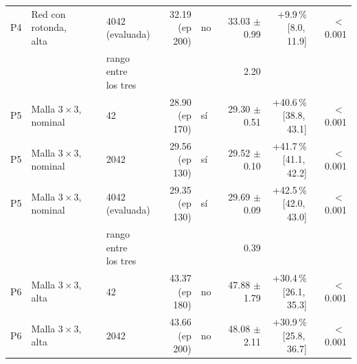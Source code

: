 \begin{table}[H]
\begin{tabular}{lllrlrrr}
P4 & \makecell[l]{Red con rotonda,\\{}alta} & \makecell[l]{4042\\{}(evaluada)} & \makecell[r]{32.19\\{}(ep 200)} & no & \makecell[r]{33.03\\{}$\pm$ 0.99} & \makecell[r]{+9.9\,\%\\{}[8.0,\,11.9]} & $<$\,0.001 \\
 & & \makecell[l]{rango entre\\{}los tres} & & & 2.20 & & \\
P5 & \makecell[l]{Malla $3 \times 3$,\\{}nominal} & 42 & \makecell[r]{28.90\\{}(ep 170)} & sí & \makecell[r]{29.30\\{}$\pm$ 0.51} & \makecell[r]{+40.6\,\%\\{}[38.8,\,43.1]} & $<$\,0.001 \\
P5 & \makecell[l]{Malla $3 \times 3$,\\{}nominal} & 2042 & \makecell[r]{29.56\\{}(ep 130)} & sí & \makecell[r]{29.52\\{}$\pm$ 0.10} & \makecell[r]{+41.7\,\%\\{}[41.1,\,42.2]} & $<$\,0.001 \\
P5 & \makecell[l]{Malla $3 \times 3$,\\{}nominal} & \makecell[l]{4042\\{}(evaluada)} & \makecell[r]{29.35\\{}(ep 130)} & sí & \makecell[r]{29.69\\{}$\pm$ 0.09} & \makecell[r]{+42.5\,\%\\{}[42.0,\,43.0]} & $<$\,0.001 \\
 & & \makecell[l]{rango entre\\{}los tres} & & & 0.39 & & \\
P6 & \makecell[l]{Malla $3 \times 3$,\\{}alta} & 42 & \makecell[r]{43.37\\{}(ep 180)} & no & \makecell[r]{47.88\\{}$\pm$ 1.79} & \makecell[r]{+30.4\,\%\\{}[26.1,\,35.3]} & $<$\,0.001 \\
P6 & \makecell[l]{Malla $3 \times 3$,\\{}alta} & 2042 & \makecell[r]{43.66\\{}(ep 200)} & no & \makecell[r]{48.08\\{}$\pm$ 2.11} & \makecell[r]{+30.9\,\%\\{}[25.8,\,36.7]} & $<$\,0.001 \\

\end{tabular}
\end{table}

